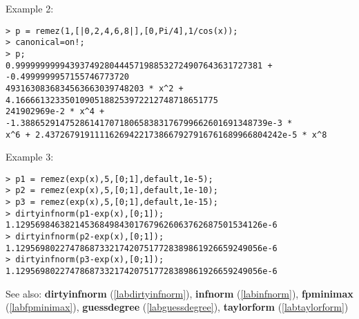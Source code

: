 \noindent Example 2: 
\begin{center}\begin{minipage}{15cm}\begin{Verbatim}[frame=single]
> p = remez(1,[|0,2,4,6,8|],[0,Pi/4],1/cos(x));
> canonical=on!;
> p;
0.99999999994393749280444571988532724907643631727381 + -0.4999999957155746773720
4931630836834563663039748203 * x^2 + 4.16666132335010905188253972212748718651775
241902969e-2 * x^4 + -1.38865291475286141707180658383176799662601691348739e-3 * 
x^6 + 2.437267919111162694221738667927916761689966804242e-5 * x^8
\end{Verbatim}
\end{minipage}\end{center}
\noindent Example 3: 
\begin{center}\begin{minipage}{15cm}\begin{Verbatim}[frame=single]
> p1 = remez(exp(x),5,[0;1],default,1e-5);
> p2 = remez(exp(x),5,[0;1],default,1e-10);
> p3 = remez(exp(x),5,[0;1],default,1e-15);
> dirtyinfnorm(p1-exp(x),[0;1]);
1.12956984638214536849843017679626063762687501534126e-6
> dirtyinfnorm(p2-exp(x),[0;1]);
1.12956980227478687332174207517728389861926659249056e-6
> dirtyinfnorm(p3-exp(x),[0;1]);
1.12956980227478687332174207517728389861926659249056e-6
\end{Verbatim}
\end{minipage}\end{center}
See also: \textbf{dirtyinfnorm} (\ref{labdirtyinfnorm}), \textbf{infnorm} (\ref{labinfnorm}), \textbf{fpminimax} (\ref{labfpminimax}), \textbf{guessdegree} (\ref{labguessdegree}), \textbf{taylorform} (\ref{labtaylorform})
